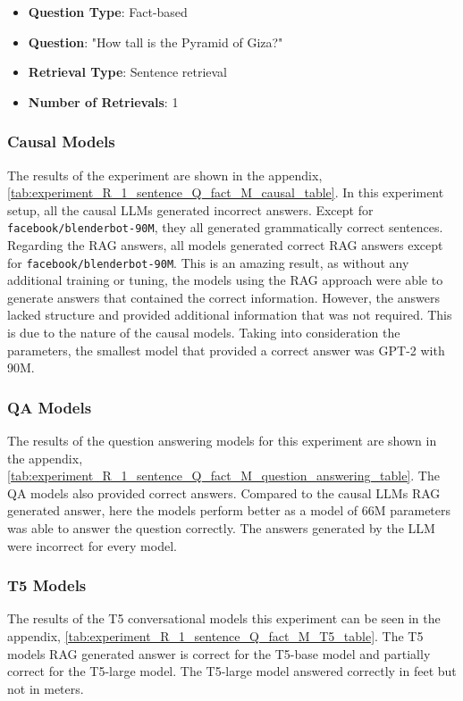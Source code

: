 \documentclass{wseas}
\begin{document}
\begin{itemize}
  \item
    \textbf{Question Type}: Fact-based
  \item
    \textbf{Question}: "How tall is the Pyramid of Giza?"
  \item
    \textbf{Retrieval Type}: Sentence retrieval
  \item
    \textbf{Number of Retrievals}: 1
\end{itemize}

\subsubsection{Causal Models}

The results of the experiment are shown in the appendix, \autoref{tab:experiment_R_1_sentence_Q_fact_M_causal_table}.
In this experiment setup, all the causal LLMs generated incorrect answers. 
Except for \texttt{facebook/blenderbot-90M}, they all generated grammatically correct sentences. 
Regarding the RAG answers, all models generated correct RAG answers except for \texttt{facebook/blenderbot-90M}.
This is an amazing result, as without any additional training or tuning, the models
using the RAG approach were able to generate answers that contained the correct information.
However, the answers lacked structure and provided additional information that was not required. 
This is due to the nature of the causal models. Taking into consideration the parameters,
the smallest model that provided a correct answer was GPT-2 with 90M.
\subsubsection{QA Models}

The results of the question answering models for this experiment
are shown in the appendix, \autoref{tab:experiment_R_1_sentence_Q_fact_M_question_answering_table}.
The QA models also provided correct answers. Compared to the causal LLMs
RAG generated answer, here the models perform better as a model of 66M parameters
was able to answer the question correctly. The answers generated by the LLM were incorrect for every model.

\subsubsection{T5 Models}


The results of the T5 conversational models this experiment can be seen in the appendix, \autoref{tab:experiment_R_1_sentence_Q_fact_M_T5_table}.
The T5 models RAG generated answer is correct for the T5-base model and partially correct
for the T5-large model. The T5-large model answered correctly in feet but not in meters.
\end{document}
